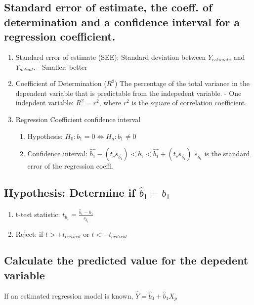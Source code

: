 \documentclass{article}
\begin{document}
\subsection{Standard error of estimate, the coeff. of determination and a 
confidence interval for a regression coefficient.}
\begin{enumerate}
    \item Standard error of estimate (SEE): Standard deviation between $Y_{estimate}$
        and $Y_{actual}$. - Smaller: better
    \item Coefficient of Determination ($R^2$)
        The percentage of the total variance in the dependent variable that is 
        predictable from the indepedent variable. - One indepdent variable: $R^2=r^2$,
        where $r^2$ is the square of correlation coefficient.
    \item Regression Coefficient confidence interval
        \begin{enumerate}
            \item Hypothesis: $H_0: b_1=0 \Leftrightarrow H_a: b_1\neq 0$ 
            \item Confidence interval:
                $\hat{b_1}-(t_c s_{\hat{b_1}})<b_1<\hat{b_1}+(t_c s_{\hat{b_1}})$ 
            $s_{\hat{b}_1}$ is the standard error of the regression coeffi.  
        \end{enumerate}
\end{enumerate}
\subsection{Hypothesis: Determine if $\hat{b}_1=b_1$}
\begin{enumerate}
    \item t-test statistic: $t_{b_1}=\frac{\hat{b}_1 - b_1}{s_{\hat{b}_1}}$
    \item Reject: if $t>+t_{critical}$ or $t<-t_{critical}$
\end{enumerate}
\subsection{Calculate the predicted value for the depedent variable}
If an estimated regression model is known, $\hat{Y}=\hat{b}_0+\hat{b}_1 X_p$
\end{document}
